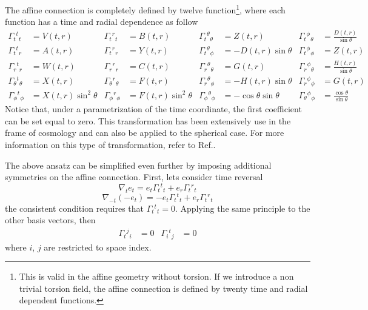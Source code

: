 \documentclass{article}
\providecommand{\ctG}[3]{\Gamma_{#1}{}^{ #2}{}_{#3}}
\begin{document}
The affine connection is completely defined by twelve function\footnote{This is valid
in the affine geometry without torsion. If we introduce a non trivial torsion field,
the affine connection is defined by twenty time and radial dependent functions.}, where
each function has a time and radial dependence as follow
\begin{equation}
\begin{aligned}
    \ctG{t}{t}{t} & = V(t,r) & \ctG{t}{r}{t} & = B(t,r) & \ctG{t}{\theta}{\theta} & = Z(t,r) & \ctG{t}{\phi}{\theta} & = \frac{D(t,r)}{\sin\theta} \\
    \ctG{t}{t}{r} & = A(t,r) & \ctG{t}{r}{r} & = Y(t,r) & \ctG{t}{\theta}{\phi} & = -D(t,r)\sin\theta & \ctG{t}{\phi}{\phi} & = Z(t,r) \\
    \ctG{r}{t}{r} & = W(t,r) & \ctG{r}{r}{r} & = C(t,r) & \ctG{r}{\theta}{\theta} & = G(t,r) & \ctG{r}{\phi}{\theta} & = \frac{H(t,r)}{\sin\theta} \\
    \ctG{\theta}{t}{\theta} & = X(t,r) & \ctG{\theta}{r}{\theta} & = F(t,r) & \ctG{r}{\theta}{\phi} & = -H(t,r)\sin\theta & \ctG{r}{\phi}{\phi} & = G(t,r) \\
    \ctG{\phi}{t}{\phi} & = X(t,r)\sin^2\theta & \ctG{\phi}{r}{\phi} & = F(t,r)\sin^2\theta & \ctG{\phi}{\theta}{\phi} & = -\cos\theta\sin\theta & \ctG{\theta}{\phi}{\phi} & = \frac{\cos\theta}{\sin \theta}
\end{aligned}
\end{equation}
Notice that, under a parametrization of the time coordinate, the first coefficient
can be set equal to zero. This transformation has been extensively use in the 
frame of cosmology and can also be applied to the spherical case. For more 
information on this type of transformation, refer to Ref.\cite{Jose_EPJC_2022}.

The above ansatz can be simplified even further by imposing additional 
symmetries on the affine connection. First, lets consider time reversal
\begin{equation}
    \nabla_{t}e_t = e_t\ctG{t}{t}{t} + e_r\ctG{t}{r}{t}
\end{equation}
\begin{equation}
    \nabla_{-t}\left(-e_t\right) = -e_t\ctG{t}{t}{t} + e_r\ctG{t}{r}{t}
\end{equation}
the consistent condition requires that $\ctG{t}{t}{t} = 0$. Applying the same principle
to the other basis vectors, then
\begin{align}
    \ctG{t}{j}{i} & = 0 & \ctG{i}{t}{j} & = 0
\end{align}
where $i$, $j$ are restricted to space index.
\end{document}
